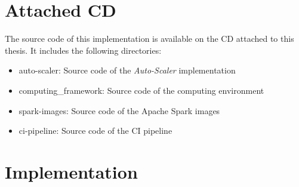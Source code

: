 \chapter{Attached CD}
\label{chap:appendix_cd}
The source code of this implementation is available on the CD attached to this thesis. It includes the following directories:
\begin{itemize}
\item auto-scaler: Source code of the \textit{Auto-Scaler} implementation
\item computing\_framework: Source code of the computing environment
\item spark-images: Source code of the Apache Spark images
\item ci-pipeline: Source code of the CI pipeline
\end{itemize}

\chapter{Implementation}

